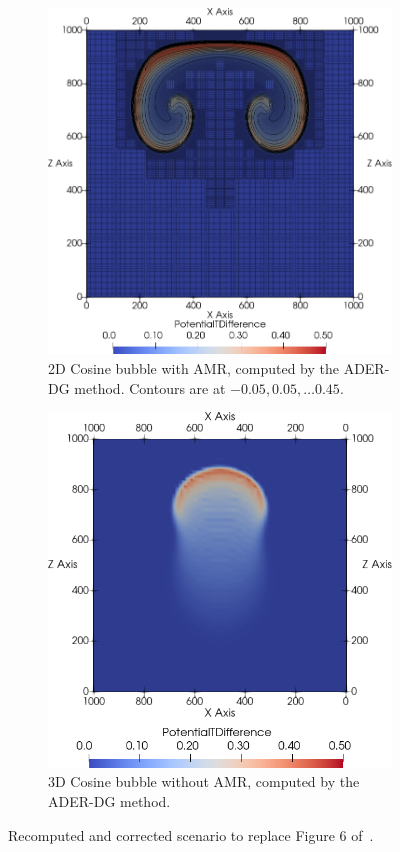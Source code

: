 \documentclass[runningheads]{llncs}
\begin{document}
\begin{figure}[htb]
  \begin{subfigure}[t]{0.45\columnwidth}
  \includegraphics[width=\textwidth]{screenshots/cosine_bubble_2d_dg.png}
  \caption{\label{fig:cosine-bubble-2d-dg-amr}%
  2D Cosine bubble with AMR, computed by the ADER-DG method.
  Contours are at $-0.05, 0.05, \ldots 0.45$.
  }
  \end{subfigure}\quad
  \begin{subfigure}[t]{0.45\columnwidth}
  \includegraphics[width=1\textwidth]{screenshots/cosine_bubble_3d_dg.png}
  \caption{\label{fig:cosine-bubble-3d-dg-noamr}%
  3D Cosine bubble without AMR, computed by the ADER-DG method.}
  \end{subfigure}
\caption{
  Recomputed and corrected scenario to replace Figure 6 of~\cite{krenz2019high}.
}
\end{figure}
\end{document}

